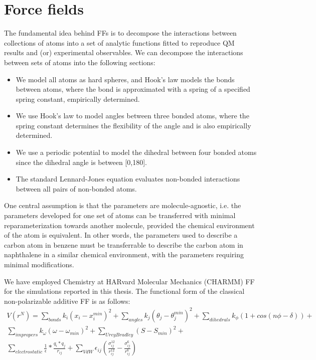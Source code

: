 
    \section{Force fields}
    The fundamental idea behind FFs is to decompose the interactions between collections of atoms into a set of analytic functions fitted to reproduce QM results and (or) experimental observables. We can decompose the interactions between sets of atoms into the following sections:
    \begin{itemize}
        \item We model all atoms as hard spheres, and Hook's law models the bonds between atoms, where the bond is approximated with a spring of a specified spring constant, empirically determined. 
        \item We use Hook's law to model angles between three bonded atoms, where the spring constant determines the flexibility of the angle and is also empirically determined. 
        \item We use a periodic potential to model the dihedral between four bonded atoms since the dihedral angle is between [0,180]. 
        \item The standard Lennard-Jones equation evaluates non-bonded interactions between all pairs of non-bonded atoms.
    \end{itemize}
    One central assumption is that the parameters are molecule-agnostic, i.e. the parameters developed for one set of atoms can be transferred with minimal reparameterization towards another molecule, provided the chemical environment of the atom is equivalent. In other words, the parameters used to describe a carbon atom in benzene must be transferrable to describe the carbon atom in naphthalene in a similar chemical environment, with the parameters requiring minimal modifications.
    
    We have employed Chemistry at HARvard Molecular Mechanics (CHARMM) FF for the simulations reported in this thesis. The functional form of the classical non-polarizable additive FF is as follows:
    \begin{multline*}
        V(r^N) = \sum_{bonds}^{}k_i(x_i-x_i^{min})^2 + \sum_{angles}^{}k_j(\theta_j-\theta_j^{min})^2 + \sum_{dihedrals}^{}k_{\phi}(1 + cos(n\phi-\delta)) + \\ \sum_{impropers}^{} k_{\omega}(\omega - \omega_{min})^2 + \sum_{UreyBradley}^{}(S-S_{min})^2 + \\ \sum_{electrostatic}^{}\frac{1}{\epsilon}*\frac{q_i * q_j}{r_{ij}} +  \sum_{VdW}^{}\epsilon_{ij}(\frac{\sigma_{ij}^{12}}{r_{ij}^{12}}-\frac{\sigma_{ij}^{6}}{r_{ij}^6})
    \end{multline*}
    
